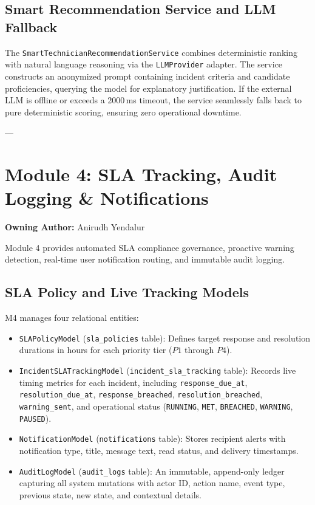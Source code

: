 \documentclass[11pt,a4paper,oneside]{report}
\begin{document}
\subsection{Smart Recommendation Service and LLM Fallback}
The \texttt{SmartTechnicianRecommendationService} combines deterministic ranking with natural language reasoning via the \texttt{LLMProvider} adapter. The service constructs an anonymized prompt containing incident criteria and candidate proficiencies, querying the model for explanatory justification. If the external LLM is offline or exceeds a 2000\,ms timeout, the service seamlessly falls back to pure deterministic scoring, ensuring zero operational downtime.

---

\section{Module 4: SLA Tracking, Audit Logging \& Notifications}
\label{sec:module_m4}
\textbf{Owning Author:} Anirudh Yendalur

Module 4 provides automated SLA compliance governance, proactive warning detection, real-time user notification routing, and immutable audit logging.

\subsection{SLA Policy and Live Tracking Models}
M4 manages four relational entities:
\begin{itemize}
    \item \texttt{SLAPolicyModel} (\texttt{sla\_policies} table): Defines target response and resolution durations in hours for each priority tier ($P1$ through $P4$).
    \item \texttt{IncidentSLATrackingModel} (\texttt{incident\_sla\_tracking} table): Records live timing metrics for each incident, including \texttt{response\_due\_at}, \texttt{resolution\_due\_at}, \texttt{response\_breached}, \texttt{resolution\_breached}, \texttt{warning\_sent}, and operational status (\texttt{RUNNING}, \texttt{MET}, \texttt{BREACHED}, \texttt{WARNING}, \texttt{PAUSED}).
    \item \texttt{NotificationModel} (\texttt{notifications} table): Stores recipient alerts with notification type, title, message text, read status, and delivery timestamps.
    \item \texttt{AuditLogModel} (\texttt{audit\_logs} table): An immutable, append-only ledger capturing all system mutations with actor ID, action name, event type, previous state, new state, and contextual details.
\end{itemize}
\end{document}
